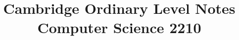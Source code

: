 \documentclass{article}
\title{Cambridge Ordinary Level Notes \\ Computer Science 2210}
\begin{document}
\maketitle{}\newpage\tableofcontents

% 
\end{document}
